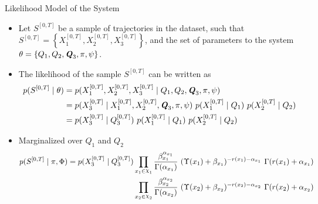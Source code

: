 \documentclass[
english,%
aspectratio=169,%
color={accentcolor=3b},
logo=true,%
colorframetitle=false,%
]{tudabeamer}
\DeclareRobustCommand{\rchi}{{\mathpalette\irchi\relax}}
\newcommand{\irchi}[2]{\raisebox{\depth}{$#1\chi$}}
\begin{document}
\begin{frame}{Likelihood Model of the System}
\fontsize{9pt}{6}\selectfont
\begin{itemize}
\item Let $ S^{[0,T]} $ be a sample of trajectories in the dataset, such that $ S^{[0,T]} = \left\lbrace  X_{1}^{[0, T]}, X_{2}^{[0, T]}, X_{3}^{[0, T]} \right\rbrace   $, and the set of parameters to the system $  \theta = \left\lbrace  Q_{1}, Q_{2}, \textbf{\textit{Q}}_{3}, \pi, \psi \right\rbrace  $.
\vspace{5pt}
\item The likelihood of the sample $ S^{[0,T]} $ can be written as
\begin{align}
p(S^{[0,T]} \mid \theta ) & = p(X_{1}^{[0, T]}, X_{2}^{[0, T]}, X_{3}^{[0, T]} \mid Q_{1}, Q_{2}, \textbf{\textit{Q}}_{3}, \pi, \psi) \nonumber\\ & = p(X_{3}^{[0, T]} \mid X_{1}^{[0, T]}, X_{2}^{[0, T]}, \textbf{\textit{Q}}_{3}, \pi, \psi) \ p(X_{1}^{[0, T]}\mid Q_{1}) \ p(X_{2}^{[0, T]}\mid Q_{2}) \nonumber\\ & = p(X_{3}^{[0, T]}\mid Q_{3}^{[0, T]}) \ p(X_{1}^{[0, T]}\mid Q_{1}) \ p(X_{2}^{[0, T]}\mid Q_{2}) 
\end{align}
\item Marginalized over $ Q_1 $ and $ Q_2 $
\begin{align}
\begin{split}
p(S^{[0,T]} \mid \pi, \Phi ) = p(X_{3}^{[0, T]}\mid Q_{3}^{[0, T]}) \prod_{x_{1}\in\rchi_1} \frac{\beta_{x_{1}}^{\alpha_{x_{1}}}}{\Gamma(\alpha_{x_{1}})} \ (\Upsilon(x_{1})+\beta_{x_{1}})^{-r(x_{1})-\alpha_{x_{1}}}\ \Gamma(r(x_{1}) + \alpha_{x_{1}})  \\  \prod_{x_{2}\in\rchi_2} \frac{\beta_{x_{2}}^{\alpha_{x_{2}}}}{\Gamma(\alpha_{x_{2}})} \ (\Upsilon(x_{2})+\beta_{x_{2}})^{{-r(x_2)} - \alpha_{x_{2}}}\ \Gamma(r(x_2) + \alpha_{x_{2}})
\label{eq:Marg_llh_final}
\end{split}
\end{align}
\end{itemize}
\end{frame}
\end{document}
